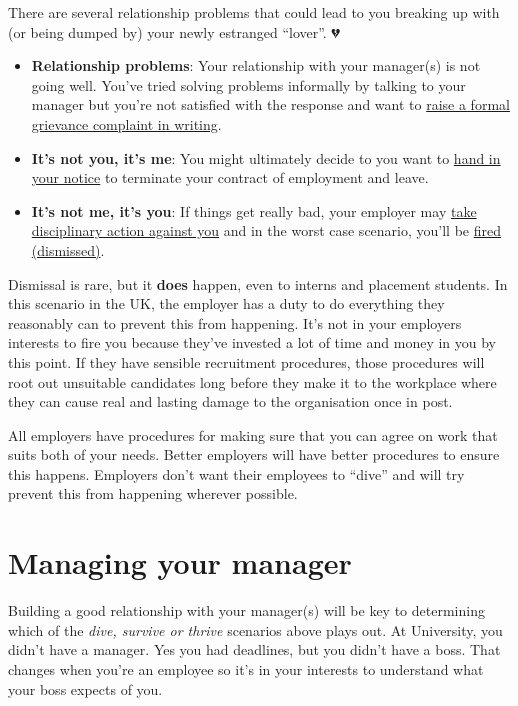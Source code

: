 \documentclass[
]{book}
\providecommand{\tightlist}{%
  \setlength{\itemsep}{0pt}\setlength{\parskip}{0pt}}
\begin{document}
There are several relationship problems that could lead to you breaking up with (or being dumped by) your newly estranged ``lover''. 💔

\begin{itemize}
\tightlist
\item
  \textbf{Relationship problems}: Your relationship with your manager(s) is not going well. You've tried solving problems informally by talking to your manager but you're not satisfied with the response and want to \href{https://www.gov.uk/raise-grievance-at-work}{raise a formal grievance complaint in writing}. \citep{grievance}
\item
  \textbf{It's not you, it's me}: You might ultimately decide to you want to \href{https://www.gov.uk/handing-in-your-notice}{hand in your notice} to terminate your contract of employment and leave. \citep{iquit}
\item
  \textbf{It's not me, it's you}: If things get really bad, your employer may \href{https://www.gov.uk/disciplinary-procedures-and-action-at-work}{take disciplinary action against you} \citep{dive} and in the worst case scenario, you'll be \href{https://www.gov.uk/dismissal}{fired (dismissed)}. \citep{yourefired}
\end{itemize}

Dismissal is rare, but it \textbf{does} happen, even to interns and placement students. In this scenario in the UK, the employer has a duty to do everything they reasonably can to prevent this from happening. It's not in your employers interests to fire you because they've invested a lot of time and money in you by this point. If they have sensible recruitment procedures, those procedures will root out unsuitable candidates long before they make it to the workplace where they can cause real and lasting damage to the organisation once in post.

All employers have procedures for making sure that you can agree on work that suits both of your needs. Better employers will have better procedures to ensure this happens. Employers don't want their employees to ``dive'' and will try prevent this from happening wherever possible.

\hypertarget{manager}{%
\section{Managing your manager}\label{manager}}

Building a good relationship with your manager(s) will be key to determining which of the \emph{dive, survive or thrive} scenarios above plays out. At University, you didn't have a manager. Yes you had deadlines, but you didn't have a boss. That changes when you're an employee so it's in your interests to understand what your boss expects of you.
\end{document}
